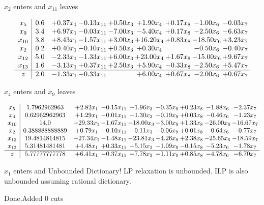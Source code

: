 \documentclass[8pt]{article}
\begin{document}
 $ x_{2} $ enters and $ x_{11} $ leaves 

 \[\begin{array}{c| c c@{\hskip 2pt} c@{\hskip 2pt} c@{\hskip 2pt} c@{\hskip 2pt} c@{\hskip 2pt} c@{\hskip 2pt} c@{\hskip 2pt} }
 x_{5}   &  0.6 & +  0.37 x_{1} & -0.13 x_{11} & +  0.50 x_{3} & +  1.90 x_{4} & +  0.17 x_{8} & -1.00 x_{6} & -0.03 x_{7}\\
 x_{9}   &  3.4 & +  6.97 x_{1} & -0.03 x_{11} & -7.00 x_{3} & -5.40 x_{4} & +  0.17 x_{8} & -2.50 x_{6} & -6.63 x_{7}\\
 x_{10}   &  3.8 & +  8.43 x_{1} & -1.57 x_{11} & +  3.00 x_{3} & + 16.20 x_{4} & +  0.83 x_{8} & -18.50 x_{6} & +  3.23 x_{7}\\
 x_{2}   &  0.2 & +  0.40 x_{1} & -0.10 x_{11} & +  0.50 x_{3} & +  0.30 x_{4} &   & -0.50 x_{6} & -0.40 x_{7}\\
 x_{12}   &  5.0 & -2.33 x_{1} & -1.33 x_{11} & +  6.00 x_{3} & + 23.00 x_{4} & +  1.67 x_{8} & -15.00 x_{6} & +  9.67 x_{7}\\
 x_{13}   &  1.6 & -3.13 x_{1} & +  0.37 x_{11} & +  2.50 x_{3} & +  5.90 x_{4} & -0.33 x_{8} & -2.50 x_{6} & +  5.47 x_{7}\\
\hline
z    &  2.0 & -1.33 x_{1} & -0.33 x_{11} &   & +  6.00 x_{4} & +  0.67 x_{8} & -2.00 x_{6} & +  0.67 x_{7}\\
\end{array}\]


 $ x_{4} $ enters and $ x_{9} $ leaves 

 \[\begin{array}{c| c c@{\hskip 2pt} c@{\hskip 2pt} c@{\hskip 2pt} c@{\hskip 2pt} c@{\hskip 2pt} c@{\hskip 2pt} c@{\hskip 2pt} }
 x_{5}   &  1.7962962963 & +  2.82 x_{1} & -0.15 x_{11} & -1.96 x_{3} & -0.35 x_{9} & +  0.23 x_{8} & -1.88 x_{6} & -2.37 x_{7}\\
 x_{4}   &  0.62962962963 & +  1.29 x_{1} & -0.01 x_{11} & -1.30 x_{3} & -0.19 x_{9} & +  0.03 x_{8} & -0.46 x_{6} & -1.23 x_{7}\\
 x_{10}   &  14.0 & + 29.33 x_{1} & -1.67 x_{11} & -18.00 x_{3} & -3.00 x_{9} & +  1.33 x_{8} & -26.00 x_{6} & -16.67 x_{7}\\
 x_{2}   &  0.388888888889 & +  0.79 x_{1} & -0.10 x_{11} & +  0.11 x_{3} & -0.06 x_{9} & +  0.01 x_{8} & -0.64 x_{6} & -0.77 x_{7}\\
 x_{12}   &  19.4814814815 & + 27.34 x_{1} & -1.48 x_{11} & -23.81 x_{3} & -4.26 x_{9} & +  2.38 x_{8} & -25.65 x_{6} & -18.59 x_{7}\\
 x_{13}   &  5.31481481481 & +  4.48 x_{1} & +  0.33 x_{11} & -5.15 x_{3} & -1.09 x_{9} & -0.15 x_{8} & -5.23 x_{6} & -1.78 x_{7}\\
\hline
z    &  5.77777777778 & +  6.41 x_{1} & -0.37 x_{11} & -7.78 x_{3} & -1.11 x_{9} & +  0.85 x_{8} & -4.78 x_{6} & -6.70 x_{7}\\
\end{array}\]


 $ x_{1} $ enters and Unbounded Dictionary!
 LP relaxation is unbounded. ILP is also unbounded assuming rational dictionary. 

Done.Added 0 cuts 
\end{document}
